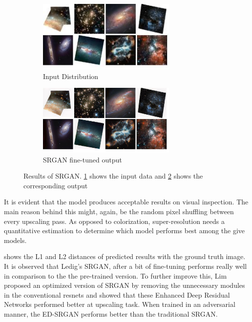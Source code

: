 \documentclass[10pt,twocolumn,letterpaper]{article}
\begin{document}
    \begin{figure}[!htb]
    	\centering
    	\begin{subfigure}[b]{0.35\textwidth}
    		\centering
    		\includegraphics[width=0.75\textwidth]{figures/inputsamples_superR}
    		\caption{Input Distribution}
    		\label{fig: sr_input_samples}
    	\end{subfigure}
    	\begin{subfigure}[b]{0.35\textwidth}
    		\centering
    		\includegraphics[width=0.75\textwidth]{figures/samples_SRGAN}
    		\caption{SRGAN fine-tuned output}
    		\label{fig: sr__outputs}
    	\end{subfigure}
    	\caption{Results of SRGAN. \cref{fig: sr_input_samples} shows the input data and \cref{fig: sr__outputs} shows the corresponding output}
    	\label{fig: sr_comparisons}
    \end{figure}
    It is evident that the model produces acceptable results on visual inspection. The main reason behind this might, again, be the random pixel shuffling between every upscaling pass. 
    As opposed to colorization, super-resolution needs a quantitative estimation to determine which model performs best among the give models. 
    
     shows the L1 and L2 distances of predicted results with the ground truth image. It is observed that Ledig's SRGAN, after a bit of fine-tuning performs really well in comparison to the the pre-trained version. To further improve this, Lim \etal\cite{lim2017enhanced} proposed an optimized version of SRGAN by removing the unnecessary modules in the conventional resnets and showed that these Enhanced Deep Residual Networks performed better at upscaling task. When trained in an adversarial manner, the ED-SRGAN performs better than the traditional SRGAN.\\
\end{document}
